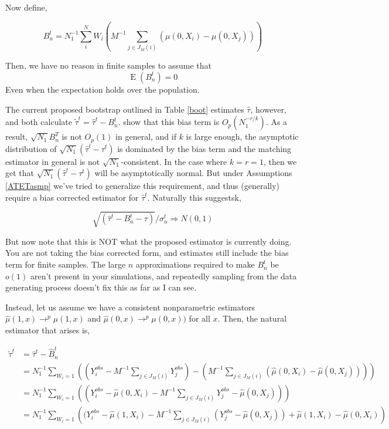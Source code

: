 \documentclass{article}
\DeclareMathOperator{\E}{E}
\newcommand{\ta}{\tau^{t}}
\newcommand{\hta}{\hat \tau^{t}}
\begin{document}
Now define, 

$$B_{n}^{t} = N_{1}^{-1}\sum_{i}^{N}W_{i}\left(M^{-1}\sum_{j \in J_{M}(i)}(\mu(0,X_{i}) - \mu(0,X_{j}))\right)$$

Then, we have no reason in finite samples to assume that 
$$\E(B_{n}^{t})=0$$
Even when the expectation holds over the population.

The current proposed bootstrap outlined in Table \ref{boot} estimates $\hat \tau$, however, \cite{OnR:16} and \cite{AnI:06} both calculate $\tilde{\tau}^{t} = \hat \tau^{t}-B_{n}^{t}$. \cite{AnI:06} show that this bias term is $O_{p}(N_{1}^{-r/k})$. As a result, $\sqrt{N_{1}}B_{n}^{T}$ is not $O_{p}(1)$ in general, and if $k$ is large enough, the asymptotic distribution of $\sqrt{N_{1}}(\hta-\ta)$ is dominated by the bias term and the matching estimator in general is not $\sqrt{N_{1}}$-consistent. In the case where $k = r = 1$, then we get that $\sqrt{N_{1}}(\hta -\ta)$ will be asymptotically normal. But under Assumptions \ref{ATETasmp} we've tried to generalize this requirement, and thus (generally) require a bias corrected estimator for $\hta$. Naturally this suggestsk,

$$\sqrt{(\hat \tau^{t}-B_{n}^{t}-\tau)}/\sigma_{n}^{t} \Rightarrow N(0,1)$$

But now note that this is NOT what the proposed estimator is currently doing. You are not taking the bias corrected form, and estimates still include the bias term for finite samples. The large $n$ approximations required to make $B_{n}^{t}$ be $o(1)$ aren't present in your simulations, and repeatedly sampling from the data generating process doesn't fix this as far as I can see.

Instead, let us assume we have a consistent nonparametric estimators $\hat \mu(1,x) \to^{p} \mu(1,x)$ and $\hat \mu(0,x) \to^{p} \mu(0,x))$ for all $x$. Then, the natural estimator that arises is,

\begin{align*}\tilde \tau^{t} &= \hat\tau^{t}-\hat B_{n}^{t} \\
&= N_{1}^{-1}\sum_{W_{i} = 1}\left((Y_{i}^{obs} -M^{-1}\sum_{j \in J_{M}(i)}Y_{j}^{obs})-\left(M^{-1}\sum_{j \in J_{M}(i)}(\hat \mu(0,X_{i}) - \hat \mu(0,X_{j}))\right)\right) \\
&= N_{1}^{-1}\sum_{W_{i} = 1}\left((Y_{i}^{obs}-\hat \mu(0,X_{i}) -M^{-1}\sum_{j \in J_{M}(i)}Y_{j}^{obs}-\hat \mu(0,X_{j}))\right) \\
&= N_{1}^{-1}\sum_{W_{i} = 1}\left((Y_{i}^{obs}-\hat \mu(1,X_{i}) -M^{-1}\sum_{j \in J_{M}(i)}(Y_{j}^{obs}-\hat \mu(0,X_{j}))+\hat \mu(1,X_{i})-\hat \mu(0,X_{i})\right)
\end{align*}
\end{document}
